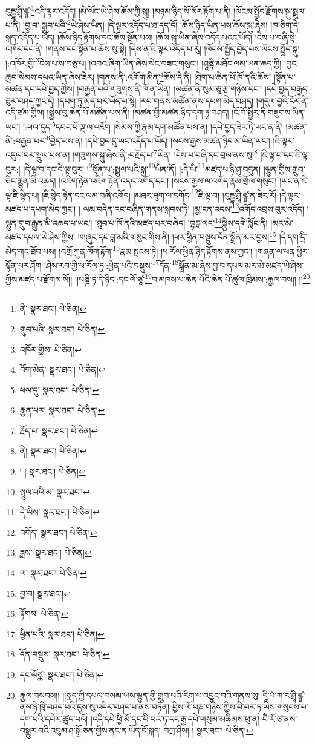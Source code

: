 བུདྡྷ་ཤྲཱི་ཛྙཱ་\footnote{ནི་  སྣར་ཐང་།  པེ་ཅིན། }འདི་ལྟར་འདོད། །མེ་ལོང་ཡེ་ཤེས་ཆོས་ཀྱི་སྐུ། །མཉམ་ཉིད་སོ་སོར་རྟོག་པ་ནི། །ལོངས་སྤྱོད་རྫོགས་སྐུ་སྤྲུལ་པ་ནི། །བྱ་བ་:སྒྲུབ་པའི་\footnote{གྲུབ་པའི་  སྣར་ཐང་།  པེ་ཅིན། }ཡེ་ཤེས་ཡིན། །དེ་ལྟར་འདོད་པ་ཐ་དད་དོ། །ཆོས་ཉིད་ཡིན་པས་ཆོས་སྐུ་ཞེས། །ཁ་ཅིག་དེ་སྐད་འདོད་པ་ཡོད། །ཆོས་ཉིད་རྟོགས་དང་ཆོས་སྟོན་པས། །ཆོས་སྐུ་ཡིན་ཞེས་འདོད་པའང་ཡོད། །ངེས་པ་བཞི་སྟེ་འཁོར་དང་ནི། །གནས་དང་སྟོན་པ་ཆོས་སུ་སྟེ། །དེས་ན་ཇི་ལྟར་འདོད་པ་རུ། །ལོངས་སྤྱོད་བྱེད་པས་ལོངས་སྤྱོད་སྐུ། །:འཁོར་གྱི་\footnote{འཁོར་གྱིས་  པེ་ཅིན། }ངེས་པ་ས་བཅུ་པ། །འབའ་ཞིག་ཡིན་ཞེས་སེང་བཟང་གསུང་། །ཤཱནྟི་མཐོང་ལམ་ཡན་ཆད་ཀྱི། །བྱང་ཆུབ་སེམས་དཔའ་ཡིན་ཞེས་ཟེར། །གནས་ནི་:འགོག་མིན་\footnote{འོག་མིན་  སྣར་ཐང་།  པེ་ཅིན། }ཆོས་དེ་ནི། །ཐེག་པ་ཆེན་པོ་ཁོ་ནའི་ཆོས། །སྟོན་པ་མཚན་དང་དཔེ་བྱད་ཀྱིས། །བརྒྱན་པའི་གཟུགས་ནི་ཁོ་ན་ཡིན། །མཚན་ནི་སུམ་ཅུ་རྩ་གཉིས་དང་། །དཔེ་བྱད་བརྒྱད་ཅུར་བཤད་ཀྱང་དེ། །དཔག་ཏུ་མེད་པར་ཡོད་པ་སྟེ། །རབ་གནས་མཚོན་ནས་དཔག་མེད་བཤད། །གདུལ་བྱའི་ངོར་ནི་འདི་ཙམ་གྱིས། །སྐྱེས་བུ་ཆེན་པོ་མཚོན་པས་ནི། །མཚན་གྱི་མཚན་ཉིད་དག་ཏུ་བཤད། །ངོ་བོ་སྤྱིར་ནི་གཟུགས་ཡིན་ཡང་། །:ཕལ་དུད་\footnote{ཕལ་དུ་  སྣར་ཐང་།  པེ་ཅིན། }དབང་པོ་ལྔ་ལ་འཇོག །སེམས་ཀྱི་རྣམ་དག་མཚོན་པས་ན། །དཔེ་བྱད་ཟེར་ཏེ་ཡང་ན་ནི། །མཚན་ནི་:བརྒྱན་པར་\footnote{རྒྱན་པར་  སྣར་ཐང་།  པེ་ཅིན། }བྱེད་པས་ན། །དཔེ་བྱད་དུ་ཡང་འདོད་པ་ཡོད། །སངས་རྒྱས་མཚན་ཉིད་མ་ཡིན་ཡང་། །ཇི་ལྟར་འདུལ་བར་སྤྲུལ་པས་ན། །གཟུགས་སྐུ་ཞེས་ནི་:བརྗོད་པ་\footnote{རྗོད་པ་  སྣར་ཐང་།  པེ་ཅིན། }ཡིན། །ངེས་པ་བཞི་དང་བྲལ་ནས་སུ།\footnote{ནི།  སྣར་ཐང་།  པེ་ཅིན། } །ཇི་ལྟ་བ་དང་ཇི་ལྟ་བུར:། །དེ་ལྟ་བ་དང་དེ་ལྟ་བུར། །\footnote{། །  སྣར་ཐང་།  པེ་ཅིན། }སྟོན་པ་:སྤྲུལ་པའི་སྐུ་\footnote{སྤྲུལ་པའི་མ་  སྣར་ཐང་། }ཡིན་ནོ། །:དེ་ཡི་\footnote{དེ་ཡིས་  སྣར་ཐང་།  པེ་ཅིན། }མཛད་པ་ཉི་ཤུ་བདུན། །ལྷུན་གྱིས་གྲུབ་ཅིང་རྒྱུན་མི་འཆད། །འཇིག་རྟེན་འཇིག་རྟེན་འདའ་འགོད་དང་། །སངས་རྒྱས་ལ་འགོད་རྣམ་གྲོལ་གསུང་། །ཡང་ན་ཇི་ལྟ་ཇི་སྙེད་པ། །ཇི་སྙེད་རྟེན་དང་ལམ་བཞི་འགོད། །མཐར་ཐུག་ལ་དགོད་\footnote{འགོད་  སྣར་ཐང་།  པེ་ཅིན། }ཇི་ལྟ་བ། །བུདྡྷ་ཤྲཱི་ཛྙཱ་ན་ཟེར་རོ། །དེ་ལྟར་མཛད་པ་དཔག་མེད་ཀྱང་། །
ལམ་བདེན་རང་བཞིན་གནས་སྐབས་ཏེ། །མྱ་ངན་འདས་\footnote{ཟླས་  སྣར་ཐང་།  པེ་ཅིན། }འགོད་འབྲས་བུར་འདོད། །ལྷུན་གྲུབ་རྒྱུན་མི་འཆད་པ་ཡང་། །ཐུབ་པ་ཁོ་ནའི་མཛད་པར་བཞེད། །བྷངྒ་ལར་\footnote{ལ་  སྣར་ཐང་།  པེ་ཅིན། }སྐྱེས་དགེ་སློང་ནི། །མར་མེ་མཛད་དཔལ་ཡེ་ཤེས་ཀྱིས། །གཞུང་དང་བླ་མའི་གསུང་གིས་ནི། །ཕར་ཕྱིན་བསྡུས་དོན་སྒྲོན་མར་བྱས།\footnote{བྱ་བ།  སྣར་ཐང་། } །དེ་དག་དྲི་མེད་གང་ཐོབ་པས། །འགྲོ་ཀུན་ལོག་རྟོག་\footnote{རྟོགས་  པེ་ཅིན། }རྣམ་སྤངས་ཏེ། །ཕ་རོལ་ཕྱིན་ཉིད་རྟོགས་ནས་ཀྱང་། །གཞན་ལ་ཕན་ཕྱིར་སྟོན་པར་ཤོག །ཤེས་རབ་ཀྱི་ཕ་རོལ་ཏུ་:ཕྱིན་པའི་བསྡུས་\footnote{ཕྱིན་པའི་  སྣར་ཐང་།  པེ་ཅིན། }དོན་\footnote{དོན་བསྡུས་  སྣར་ཐང་།  པེ་ཅིན། }སྒྲོན་མ་ཞེས་བྱ་བ་དཔལ་མར་མེ་མཛད་ཡེ་ཤེས་ཀྱིས་མཛད་པ་རྫོགས་སོ།། །།པཎྜི་ཏ་དེ་ཉིད་:དང་ལོ་ཙཱ་\footnote{དང་ལོཙྪ་  སྣར་ཐང་།  པེ་ཅིན། }བ་མཁས་པ་ཆེན་པོའི་ཆེན་པོ་ཚུལ་ཁྲིམས་:རྒྱལ་བས།། །།\footnote{རྒྱལ་བསབས།། །།སླད་ཀྱི་དཔལ་བསམ་ཡས་ལྷུན་གྱི་གྲུབ་པའི་རིག་པ་འབྱུང་བའི་གནས་སུ། དཱི་པཾ་ཀ་ར་ཤྲཱི་ཛྙཱ་ནས་ཉི་ཁྲི་བཤད་པའི་དུས་སུ་འདིར་བཤད་པ་ནས་བཏོན། ཕྱིས་ལོ་པཎ་གཉིས་ཀྱིས་བི་བར་ཏ་ཡིས་གསུངས་པ་དག་པའི་དཔེར་ཚུད་པའོ། །འདི་དཔེ་ཕྱི་མོ་དང་བི་བར་ཏ་དང་རྒྱ་དཔེ་གསུམ་མཆིམས་ཕུ་ན། བཻ་རོ་ཙ་ནས་བསྒྱུར་བའི་འབུམ་ཤ་སྒྲོ་ཅན་གྱིས་ནང་ན་ཡོད་དོ་སྐད། བཀྲ་ཤིས། །  སྣར་ཐང་།  པེ་ཅིན། }